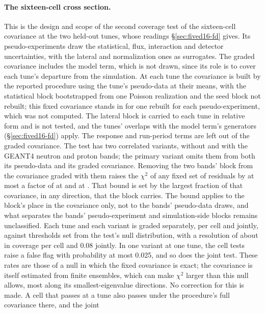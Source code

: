 \paragraph{The sixteen-cell cross section.}
\label{rlim:fived16}
This is the design and scope of the second coverage test of the sixteen-cell covariance at the two held-out tunes, whose readings \S\ref{sec:fived16-fd} gives. Its pseudo-experiments draw the statistical, flux, interaction and detector uncertainties, with the lateral and normalization ones as surrogates. The graded covariance includes the model term, which is not drawn, since its role is to cover each tune's departure from the simulation. At each tune the covariance is built by the reported procedure using the tune's pseudo-data at their means, with the statistical block bootstrapped from one Poisson realization and the seed block not rebuilt; this fixed covariance stands in for one rebuilt for each pseudo-experiment, which was not computed. The lateral block is carried to each tune in relative form and is not tested, and the tunes' overlaps with the model term's generators (\S\ref{sec:fived16-fd}) apply. The response and run-period terms are left out of the graded covariance. The test has two correlated variants, without and with the GEANT4 neutron and proton bands; the primary variant omits them from both its pseudo-data and its graded covariance. Removing the two bands' block from the covariance graded with them raises the $\chi^2$ of any fixed set of residuals by at most a factor of  at  and  at . That bound is set by the largest fraction of that covariance, in any direction, that the block carries. The bound applies to the block's place in the covariance only, not to the bands' pseudo-data draws, and what separates the bands' pseudo-experiment and simulation-side blocks remains unclassified. Each tune and each variant is graded separately, per cell and jointly, against thresholds set from the test's null distribution, with a resolution of about  in coverage per cell and 0.08 jointly. In one variant at one tune, the cell tests raise a false flag with probability at most 0.025, and so does the joint test. These rates are those of a null in which the fixed covariance is exact; the covariance is itself estimated from finite ensembles, which can make $\chi^2$ larger than this null allows, most along its smallest-eigenvalue directions. No correction for this is made. A cell that passes at a tune also passes under the procedure's full covariance there, and the joint 